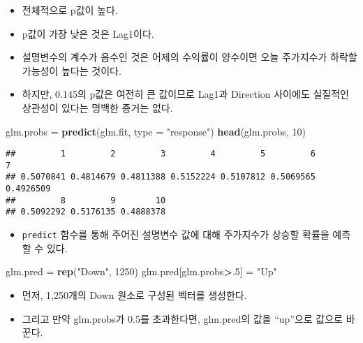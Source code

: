 \documentclass[]{article}
\newenvironment{Shaded}{\begin{snugshade}}{\end{snugshade}}
\newcommand{\KeywordTok}[1]{\textcolor[rgb]{0.13,0.29,0.53}{\textbf{#1}}}
\newcommand{\DataTypeTok}[1]{\textcolor[rgb]{0.13,0.29,0.53}{#1}}
\newcommand{\DecValTok}[1]{\textcolor[rgb]{0.00,0.00,0.81}{#1}}
\newcommand{\StringTok}[1]{\textcolor[rgb]{0.31,0.60,0.02}{#1}}
\newcommand{\OperatorTok}[1]{\textcolor[rgb]{0.81,0.36,0.00}{\textbf{#1}}}
\newcommand{\NormalTok}[1]{#1}
\providecommand{\tightlist}{%
  \setlength{\itemsep}{0pt}\setlength{\parskip}{0pt}}
\begin{document}
\begin{itemize}
\tightlist
\item
  전체적으로 p값이 높다.
\item
  p값이 가장 낮은 것은 Lag1이다.
\item
  설명변수의 계수가 음수인 것은 어제의 수익률이 양수이면 오늘 주가지수가
  하락할 가능성이 높다는 것이다.
\item
  하지만, 0.145의 p값은 여전히 큰 값이므로 Lag1과 Direction 사이에도
  실질적인 상관성이 있다는 명백한 증거는 없다.
\end{itemize}

\begin{Shaded}
\begin{Highlighting}[]
\NormalTok{glm.probs =}\StringTok{ }\KeywordTok{predict}\NormalTok{(glm.fit, }\DataTypeTok{type =} \StringTok{"response"}\NormalTok{)}
\KeywordTok{head}\NormalTok{(glm.probs, }\DecValTok{10}\NormalTok{)}
\end{Highlighting}
\end{Shaded}

\begin{verbatim}
##         1         2         3         4         5         6         7 
## 0.5070841 0.4814679 0.4811388 0.5152224 0.5107812 0.5069565 0.4926509 
##         8         9        10 
## 0.5092292 0.5176135 0.4888378
\end{verbatim}

\begin{itemize}
\tightlist
\item
  \texttt{predict} 함수를 통해 주어진 설명변수 값에 대해 주가지수가
  상승할 확률을 예측할 수 있다.
\end{itemize}

\begin{Shaded}
\begin{Highlighting}[]
\NormalTok{glm.pred =}\StringTok{ }\KeywordTok{rep}\NormalTok{(}\StringTok{"Down"}\NormalTok{, }\DecValTok{1250}\NormalTok{)}
\NormalTok{glm.pred[glm.probs}\OperatorTok{>}\NormalTok{.}\DecValTok{5}\NormalTok{] =}\StringTok{ "Up"}
\end{Highlighting}
\end{Shaded}

\begin{itemize}
\tightlist
\item
  먼저, 1,250개의 Down 원소로 구성된 벡터를 생성한다.
\item
  그리고 만약 glm.probs가 0.5를 초과한다면, glm.pred의 값을 ``up''으로
  값으로 바꾼다.
\end{itemize}
\end{document}
